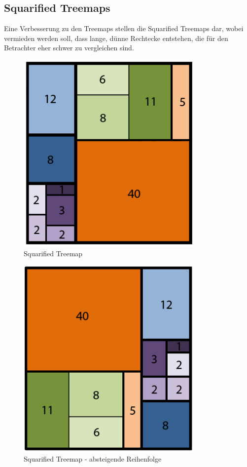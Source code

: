 \documentclass[a4paper,12pt,ngerman]{scrartcl}
\begin{document}
\subsection*{Squarified Treemaps}

Eine Verbesserung zu den Treemaps stellen die Squarified Treemaps dar, wobei vermieden werden soll, dass lange, dünne Rechtecke entstehen, die für den Betrachter eher schwer zu vergleichen sind.

\begin{figure}[ht]
    \centering
    \includegraphics[height=10cm]{includes/SquarifiedTreemaps}
    \caption{Squarified Treemap}
    \label{fig:squarifiedTreemap}
\end{figure}

\begin{figure}[ht]
    \centering
    \includegraphics[height=10cm]{includes/SquarifiedTreemaps2}
    \caption{Squarified Treemap - absteigende Reihenfolge}
    \label{fig:squarifiedTreemap2}
\end{figure}
\FloatBarrier
\end{document}
